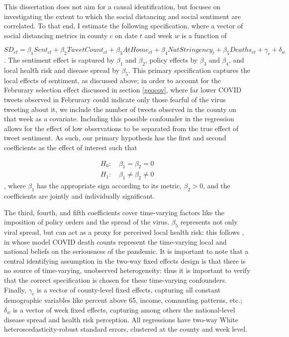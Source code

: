 \documentclass{article}
\begin{document}
This dissertation does not aim for a causal identification, but focuses on investigating the extent to which the social distancing and social sentiment are correlated. To that end, I estimate the following specification, where a vector of social distancing metrics in county \(c\) on date \(t\) and week \(w\) is a function of

\begin{equation}
  \label{eq:mainspec}
  SD_{ct} = \beta_1 Sent_{ct} + \beta_2 TweetCount_{ct} + \beta_3 AtHome_{ct} + \beta_4 NatStringency_{t} + \beta_5 Deaths_{ct} + \gamma_c + \delta_w
\end{equation}. The sentiment effect is captured by \(\beta_1\) and \(\beta_2\), policy effects by \(\beta_3\) and \(\beta_4\), and local health risk and disease spread by \(\beta_5\). This primary specification captures the local effects of sentiment, as discussed above; in order to account for the Februrary selection effect discussed in section \ref{geocov}, where far lower COVID tweets observed in Februrary could indicate only those fearful of the virus tweeting about it, we include the number of tweets observed in the county on that week as a covariate. Including this possible confounder in the regression allows for the effect of low observations to be separated from the true effect of tweet sentiment. As such, our primary hypothesis has the first and second coefficients as the effect of interest such that

\begin{align*}
  H_0 : &\: \beta_1 = \beta_2 = 0 \\
  H_1 : &\: \beta_1 \neq \beta_2 \neq 0
\end{align*}, where \(\beta_1\) has the appropriate sign according to its metric, \(\beta_2 > 0\), and the coefficients are jointly and individually significant.


The third, fourth, and fifth coefficients cover time-varying factors like the imposition of policy orders and the spread of the virus. \(\beta_5\) represents not only viral spread, but can act as a proxy for perceived local health risk: this follows \textcite{chernozhukovCausalImpactMasks2021}, in whose model COVID death counts represent the time-varying local and national beliefs on the seriousness of the pandemic. It is important to note that a central identifying assumption in the two-way fixed effects design is that there is no source of time-varying, unobserved heterogeneity: thus it is important to verify that the correct specification is chosen for these time-varying confounders. Finally, \(\gamma_c\) is a vector of county-level fixed effects, capturing all constant demographic variables like percent above 65, income, commuting patterns, etc.; \(\delta_w\) is a vector of week fixed effects, capturing among others the national-level disease spread and health risk perception. All regressions have two-way White heteroscedasticity-robust standard errors, clustered at the county and week level.
\end{document}

